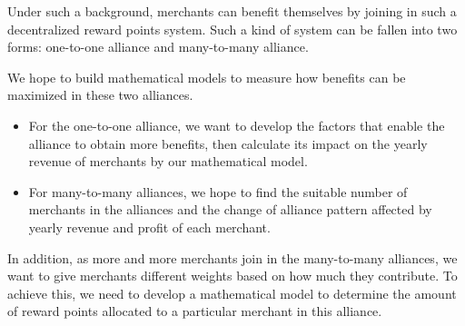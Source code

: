 Under such a background, merchants can benefit themselves by joining in such a decentralized reward points system. Such a kind of system can be fallen into two forms: one-to-one alliance and many-to-many alliance.

We hope to build mathematical models to measure how benefits can be maximized in these two alliances. 

  \begin{itemize}  
  \item
  For the one-to-one alliance, we want to develop the factors that enable the alliance to obtain more benefits, then calculate its impact on the yearly revenue of merchants by our mathematical model.

  \item 
  For many-to-many alliances, we hope to find the suitable number of merchants in the alliances and the change of alliance pattern affected by yearly revenue and profit of each merchant.
  
  \end{itemize}  

In addition, as more and more merchants join in the many-to-many alliances, we want to give merchants different weights based on how much they contribute. To achieve this, we need to develop a mathematical model to determine the amount of reward points allocated to a particular merchant in this alliance.
